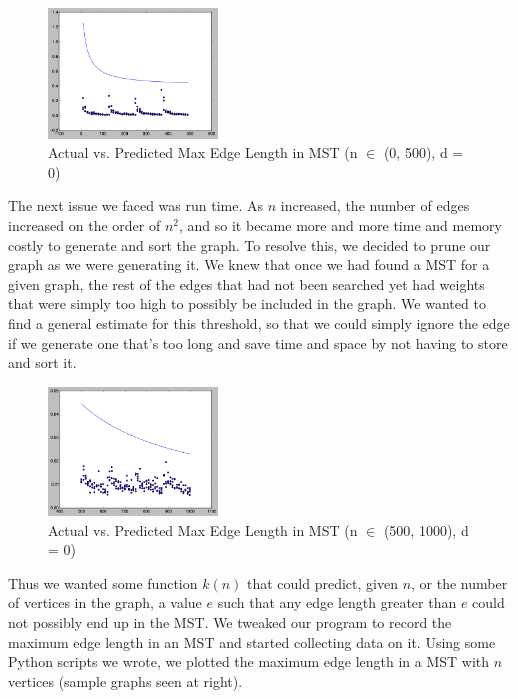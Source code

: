 \documentclass[12pt]{article}
\begin{document}
\begin{figure}
\vspace{0cm}
\centering
\includegraphics[width=0.4\textwidth]{img/knd0n1.png}
\caption{Actual vs. Predicted Max Edge Length in MST (n $\in$ (0, 500), d = 0)}
\end{figure}

The next issue we faced was run time. As $n$ increased, the number of edges increased on the order of $n^2$, and so it became more and more time and memory costly to generate and sort the graph. To resolve this, we decided to prune our graph as we were generating it. We knew that once we had found a MST for a given graph, the rest of the edges that had not been searched yet had weights that were simply too high to possibly be included in the graph. We wanted to find a general estimate for this threshold, so that we could simply ignore the edge if we generate one that's too long and save time and space by not having to store and sort it. \\

\begin{figure}
\vspace{0cm}
\centering
\includegraphics[width=0.4\textwidth]{img/knd0n2.png}
\caption{Actual vs. Predicted Max Edge Length in MST (n $\in$ (500, 1000), d = 0)}
\end{figure}

Thus we wanted some function $k(n)$ that could predict, given $n$, or the number of vertices in the graph, a value $e$ such that any edge length greater than $e$ could not possibly end up in the MST. We tweaked our program to record the maximum edge length in an MST and started collecting data on it. Using some Python scripts we wrote, we plotted the maximum edge length in a MST with $n$ vertices (sample graphs seen at right). \\
\end{document}

